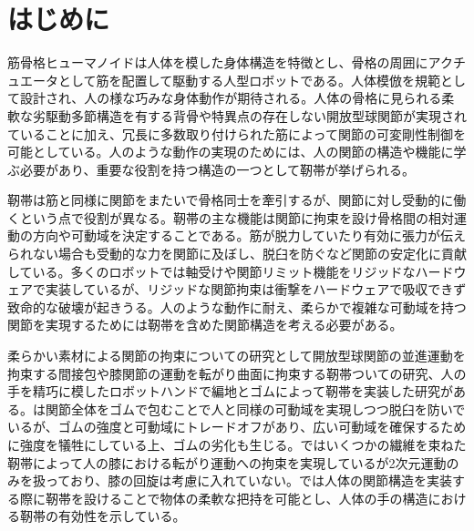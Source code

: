 \documentclass{jarticle}
\begin{document}
\date{} %

\maketitle
\thispagestyle{empty}
\pagestyle{empty}

\small
\section{はじめに}
筋骨格ヒューマノイド\cite{SR2017:asano:design}は人体を模した身体構造を特徴とし、骨格の周囲にアクチュエータとして筋を配置して駆動する人型ロボットである。人体模倣を規範として設計され、人の様な巧みな身体動作が期待される。人体の骨格に見られる柔軟な劣駆動多節構造を有する背骨や特異点の存在しない開放型球関節が実現されていることに加え、冗長に多数取り付けられた筋によって関節の可変剛性制御を可能としている。人のような動作の実現のためには、人の関節の構造や機能に学ぶ必要があり、重要な役割を持つ構造の一つとして靭帯が挙げられる。

靭帯は筋と同様に関節をまたいで骨格同士を牽引するが、関節に対し受動的に働くという点で役割が異なる。靭帯の主な機能は関節に拘束を設け骨格間の相対運動の方向や可動域を決定することである。筋が脱力していたり有効に張力が伝えられない場合も受動的な力を関節に及ぼし、脱臼を防ぐなど関節の安定化に貢献している。多くのロボットでは軸受けや関節リミット機能をリジッドなハードウェアで実装しているが、リジッドな関節拘束は衝撃をハードウェアで吸収できず致命的な破壊が起きうる。人のような動作に耐え、柔らかで複雑な可動域を持つ関節を実現するためには靭帯を含めた関節構造を考える必要がある。

柔らかい素材による関節の拘束についての研究として開放型球関節の並進運動を拘束する間接包\cite{Biorob2018:fujii:capsule}や膝関節の運動を転がり曲面に拘束する靭帯\cite{RoboSym:sonoda:ligaments}ついての研究、人の手を精巧に模したロボットハンドで編地とゴムによって靭帯を実装した研究\cite{ICRA2016:xu:hand}がある。\cite{Biorob2018:fujii:capsule}は関節全体をゴムで包むことで人と同様の可動域を実現しつつ脱臼を防いでいるが、ゴムの強度と可動域にトレードオフがあり、広い可動域を確保するために強度を犠牲にしている上、ゴムの劣化も生じる。\cite{RoboSym:sonoda:ligaments}ではいくつかの繊維を束ねた靭帯によって人の膝における転がり運動への拘束を実現しているが2次元運動のみを扱っており、膝の回旋は考慮に入れていない。\cite{ICRA2016:xu:hand}では人体の関節構造を実装する際に靭帯を設けることで物体の柔軟な把持を可能とし、人体の手の構造における靭帯の有効性を示している。
\end{document}
